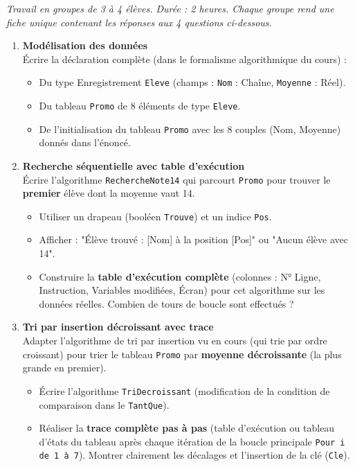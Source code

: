 \documentclass[11pt]{article}
\newcommand{\cle}[1]{{\popxbold\color{popdark}#1}}
\newcounter{popsec}
\newcounter{popsub}
\newcommand{\courssub}[1]{%
  \stepcounter{popsub}%
  \par\vspace{9pt}\noindent{\popxbold\fontsize{11.5}{13}\selectfont\color{popink}{\color{poporange}\thepopsec.\thepopsub}\hspace{6pt}#1}\par\nopagebreak\vspace{4pt}
}
\begin{document}
\courssub{Consignes}
\emph{Travail en groupes de 3 à 4 élèves. Durée : 2 heures. Chaque groupe rend une fiche unique contenant les réponses aux 4 questions ci-dessous.}

\begin{enumerate}
    \item \textbf{Modélisation des données} \\
    Écrire la déclaration complète (dans le formalisme algorithmique du cours) :
    \begin{itemize}
        \item Du type \cle{Enregistrement} \texttt{Eleve} (champs : \texttt{Nom} : Chaîne, \texttt{Moyenne} : Réel).
        \item Du tableau \texttt{Promo} de 8 éléments de type \texttt{Eleve}.
        \item De l'initialisation du tableau \texttt{Promo} avec les 8 couples (Nom, Moyenne) donnés dans l'énoncé.
    \end{itemize}

    \item \textbf{Recherche séquentielle avec table d'exécution} \\
    Écrire l'algorithme \texttt{RechercheNote14} qui parcourt \texttt{Promo} pour trouver le \textbf{premier} élève dont la moyenne vaut 14.
    \begin{itemize}
        \item Utiliser un \cle{drapeau} (booléen \texttt{Trouve}) et un indice \texttt{Pos}.
        \item Afficher : "Élève trouvé : [Nom] à la position [Pos]" ou "Aucun élève avec 14".
        \item Construire la \textbf{table d'exécution complète} (colonnes : N° Ligne, Instruction, Variables modifiées, Écran) pour cet algorithme sur les données réelles. Combien de tours de boucle sont effectués ?
    \end{itemize}

    \item \textbf{Tri par insertion décroissant avec trace} \\
    Adapter l'algorithme de tri par insertion vu en cours (qui trie par ordre croissant) pour trier le tableau \texttt{Promo} par \textbf{moyenne décroissante} (la plus grande en premier).
    \begin{itemize}
        \item Écrire l'algorithme \texttt{TriDecroissant} (modification de la condition de comparaison dans le \texttt{TantQue}).
        \item Réaliser la \textbf{trace complète pas à pas} (table d'exécution ou tableau d'états du tableau après chaque itération de la boucle principale \texttt{Pour i de 1 à 7}). Montrer clairement les décalages et l'insertion de la clé (\texttt{Cle}).
    \end{itemize}


\end{enumerate}
\end{document}
